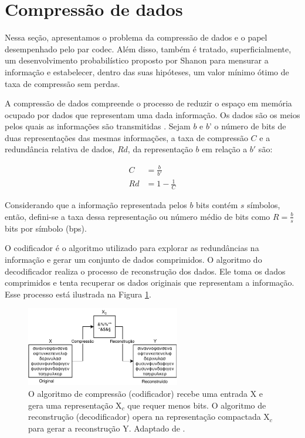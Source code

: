 \section{Compressão de dados}
Nessa seção, apresentamos o problema da compressão de dados e o papel desempenhado pelo par \gls{codec}. Além disso, também é tratado, superficialmente, um desenvolvimento probabilístico proposto por Shanon para mensurar a informação e estabelecer, dentro das suas hipóteses, um valor mínimo ótimo de taxa de compressão sem perdas.

A compressão de dados compreende o processo de reduzir o espaço em memória ocupado por dados que representam uma dada informação. Os dados são os meios pelos quais as informações são transmitidas \cite{gonzalez2009processamento}. Sejam $b$ e $b’$ o número de bits de duas representações das mesmas informações, a taxa de compressão $C$ e a redundância relativa de dados, $Rd$, da representação $b$ em relação a $b'$ são:

\begin{equation}
\label{eq:compressao}
\begin{aligned}
C &= \frac{b}{b'} \\
Rd &= 1 - \frac{1}{C}
\end{aligned}
\end{equation}

Considerando que a informação representada pelos $b$ bits contém $s$ símbolos, então, defini-se a taxa dessa representação ou número médio de bits como $R = \frac{b}{s}$ bits por símbolo (bps).   

O codificador é o algoritmo utilizado para explorar as redundâncias na informação e gerar um conjunto de dados comprimidos. O algoritmo do decodificador realiza o processo de reconstrução dos dados. Ele toma os dados comprimidos e tenta recuperar os dados originais que representam a informação. Esse processo está ilustrada na Figura \ref{fig:codec}.


\begin{figure}[h]
	\centering
	\includegraphics[width=0.6\textwidth]{figuras/codec.pdf}
	\caption[Compressão e reconstrução sem perdas.]{O algoritmo de compressão (codificador) recebe uma entrada X e gera uma representação X$_c$ que requer menos bits. O algoritmo de reconstrução (decodificador) opera na representação compactada X$_c$ para gerar a reconstrução Y. Adaptado de \cite{sayood2017introduction}.}
	\label{fig:codec}
\end{figure}


